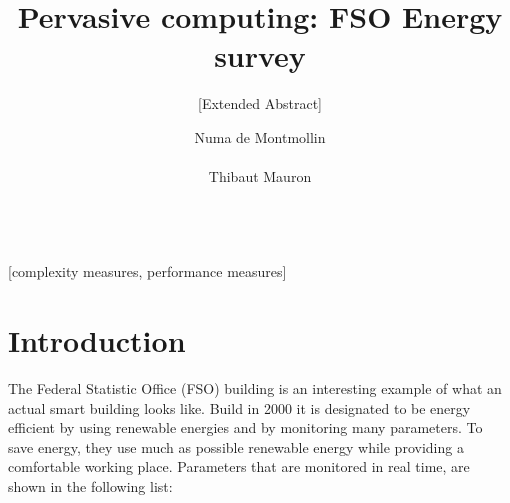 \documentclass{acm_proc_article-sp}
\begin{document}
\title{Pervasive computing: FSO Energy survey}
\subtitle{[Extended Abstract]}

%
\author{
%
%
\alignauthor
Numa de Montmollin\\
       \\
\alignauthor
Thibaut Mauron\\
       \\
}

\maketitle
\begin{abstract}

\end{abstract}

[complexity measures, performance measures]



\section{Introduction}
The Federal Statistic Office (FSO) building is an interesting example of what an actual smart building looks like. Build in 2000 it is designated to be energy efficient by using renewable energies and by monitoring many parameters. To save energy, they use much as possible renewable energy while providing a comfortable working place. Parameters that are monitored in real time, are shown in the following list:
\end{document}
